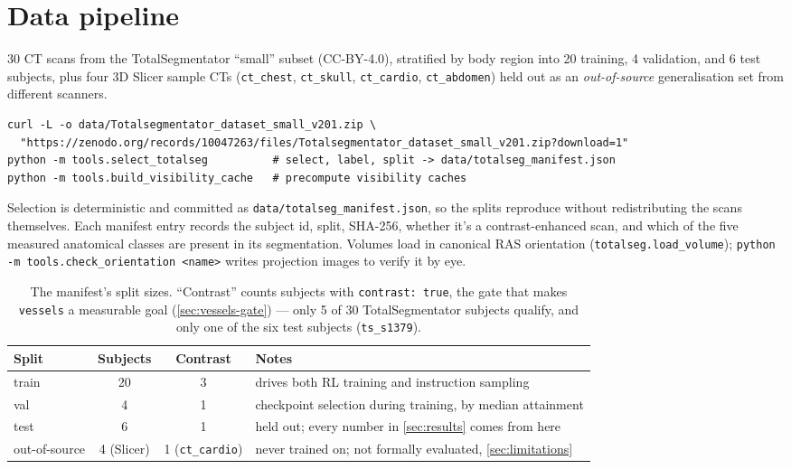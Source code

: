 \documentclass[10pt]{article}
\newcommand{\code}[1]{\texttt{#1}}
\begin{document}
\newpage
\section{Data pipeline}

30 CT scans from the TotalSegmentator ``small'' subset (CC-BY-4.0),
stratified by body region into 20 training, 4 validation, and 6 test
subjects, plus four 3D Slicer sample CTs (\code{ct\_chest}, \code{ct\_skull},
\code{ct\_cardio}, \code{ct\_abdomen}) held out as an \emph{out-of-source}
generalisation set from different scanners.

\begin{lstlisting}
curl -L -o data/Totalsegmentator_dataset_small_v201.zip \
  "https://zenodo.org/records/10047263/files/Totalsegmentator_dataset_small_v201.zip?download=1"
python -m tools.select_totalseg          # select, label, split -> data/totalseg_manifest.json
python -m tools.build_visibility_cache   # precompute visibility caches
\end{lstlisting}

Selection is deterministic and committed as \code{data/totalseg\_manifest.json},
so the splits reproduce without redistributing the scans themselves. Each
manifest entry records the subject id, split, SHA-256, whether it's a
contrast-enhanced scan, and which of the five measured anatomical classes are
present in its segmentation. Volumes load in canonical RAS orientation
(\code{totalseg.load\_volume}); \code{python -m tools.check\_orientation
<name>} writes projection images to verify it by eye.

\begin{table}[h]
\centering\small
\begin{tabular}{@{}lccl@{}}
\toprule
\textbf{Split} & \textbf{Subjects} & \textbf{Contrast} & \textbf{Notes} \\
\midrule
train & 20 & 3 & drives both RL training and instruction sampling \\
val & 4 & 1 & checkpoint selection during training, by median attainment \\
test & 6 & 1 & held out; every number in \cref{sec:results} comes from here \\
out-of-source & 4 (Slicer) & 1 (\code{ct\_cardio}) & never trained on; not formally evaluated, \cref{sec:limitations} \\
\bottomrule
\end{tabular}
\caption{The manifest's split sizes. ``Contrast'' counts subjects with
\code{contrast: true}, the gate that makes \code{vessels} a measurable goal
(\cref{sec:vessels-gate}) --- only 5 of 30 TotalSegmentator subjects qualify,
and only one of the six test subjects (\code{ts\_s1379}).}
\end{table}
\end{document}
